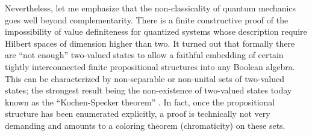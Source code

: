 \documentclass{article}
\begin{document}
Nevertheless, let me emphasize that the non-classicality of quantum mechanics goes well beyond complementarity.
There is a finite constructive proof of the impossibility
of value definiteness for quantized systems whose description require Hilbert spaces
of dimension higher than two.
It turned out that formally there are
``not enough'' two-valued states to allow a faithful embedding of certain tightly interconnected
finite propositional structures
into any Boolean algebra.
This can be characterized by
non-separable or non-unital sets of two-valued states;
the strongest result being the non-existence of two-valued states today known as the ``Kochen-Specker theorem''
\cite{kochen1}.
In fact, once the propositional structure has been enumerated explicitly, a proof is technically not very demanding
and amounts to a coloring theorem (chromaticity) on these sets.
\end{document}
